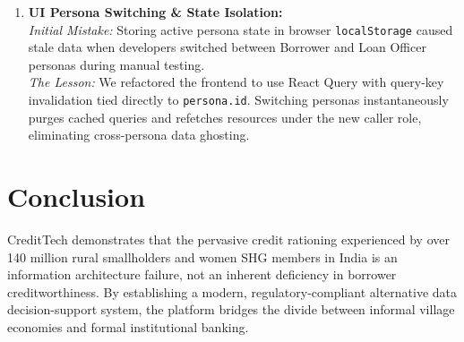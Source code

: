 \documentclass[11pt,a4paper,oneside]{report}
\begin{document}
\begin{enumerate}
  \item \textbf{UI Persona Switching \& State Isolation:}\\
  \textit{Initial Mistake:} Storing active persona state in browser \texttt{localStorage} caused stale data when developers switched between Borrower and Loan Officer personas during manual testing.\\
  \textit{The Lesson:} We refactored the frontend to use React Query with query-key invalidation tied directly to \texttt{persona.id}. Switching personas instantaneously purges cached queries and refetches resources under the new caller role, eliminating cross-persona data ghosting.
\end{enumerate}




\chapter{Conclusion}
\label{chap:conclusion}

CreditTech demonstrates that the pervasive credit rationing experienced by over 140 million rural smallholders and women SHG members in India is an information architecture failure, not an inherent deficiency in borrower creditworthiness. By establishing a modern, regulatory-compliant alternative data decision-support system, the platform bridges the divide between informal village economies and formal institutional banking.
\end{document}
